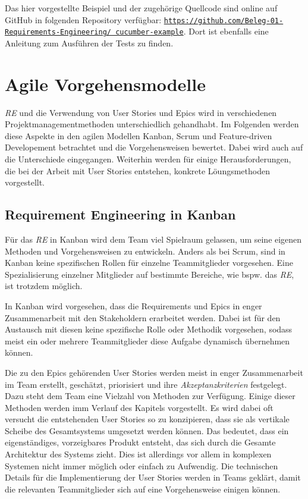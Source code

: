 \documentclass[acmtog]{acmart}
\begin{document}
Das hier vorgestellte Beispiel und der zugehörige Quellcode sind online auf GitHub in folgenden Repository verfügbar:
\href{https://github.com/Beleg-01-Requirements-Engineering/cucumber-example}{\texttt{https://github.com/Beleg-01-Requirements-Engineering/
		cucumber-example}}.
Dort ist ebenfalls eine Anleitung zum Ausführen der Tests zu finden.


\section{Agile Vorgehensmodelle}

\emph{RE} und die Verwendung von User Stories und Epics wird in verschiedenen Projektmanagementmethoden unterschiedlich gehandhabt. Im Folgenden werden 
diese Aspekte in den agilen Modellen Kanban, Scrum und Feature-driven Developement betrachtet und die Vorgehensweisen bewertet. Dabei wird auch auf die Unterschiede eingegangen. 
Weiterhin werden für einige Herausforderungen, die bei der Arbeit mit User Stories entstehen, konkrete Löungsmethoden vorgestellt.

\subsection{Requirement Engineering in Kanban}

Für das \emph{RE} in Kanban wird dem Team viel Spielraum gelassen, 
um seine eigenen Methoden und Vorgehensweisen zu entwickeln. Anders als bei Scrum, sind 
in Kanban keine spezifischen Rollen für einzelne Teammitglieder vorgesehen. Eine 
Spezialisierung einzelner Mitglieder auf bestimmte Bereiche, wie bspw. das \emph{RE}, ist trotzdem 
möglich.

In Kanban wird vorgesehen, dass die Requirements und Epics in enger Zusammenarbeit mit 
den Stakeholdern erarbeitet werden. Dabei ist für den Austausch mit diesen keine 
spezifische Rolle oder Methodik vorgesehen, sodass meist ein oder mehrere Teammitglieder 
diese Aufgabe dynamisch übernehmen können. \cite{agileprocesses}

Die zu den Epics gehörenden User Stories werden meist in enger Zusammenarbeit im Team erstellt, 
geschätzt, priorisiert und ihre \emph{Akzeptanzkriterien} festgelegt. Dazu steht dem Team eine Vielzahl 
von Methoden zur Verfügung. Einige dieser Methoden werden imm Verlauf des Kapitels vorgestellt. 
Es wird dabei oft versucht die entstehenden User Stories so zu konzipieren, dass sie als vertikale 
Scheibe des Gesamtsystems umgesetzt werden können. Das bedeutet, dass ein eigenständiges, vorzeigbares 
Produkt entsteht, das sich durch die Gesamte Architektur des Systems zieht. Dies ist allerdings 
vor allem in komplexen Systemen nicht immer möglich oder einfach zu Aufwendig. Die technischen Details für die Implementierung 
der User Stories werden in Teams geklärt, damit die relevanten Teammitglieder sich auf eine Vorgehensweise 
einigen können. \cite{agileprocesses}
\end{document}
